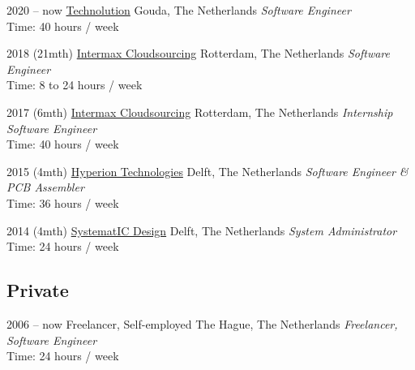\documentclass[]{friggeri-cv}
\begin{document}
\begin{entrylist}


\entry
{2020 -- now}
{\href{https://technolution.eu/}{Technolution}}
{Gouda, The Netherlands}
{\emph{Software Engineer} \\
Time: 40 hours / week}


\entry
{2018 (21mth)}
{\href{https://intermax.nl/}{Intermax Cloudsourcing}}
{Rotterdam, The Netherlands}
{\emph{Software Engineer} \\
Time: 8 to 24 hours / week}


\entry
{2017 (6mth)}
{\href{https://intermax.nl/}{Intermax Cloudsourcing}}
{Rotterdam, The Netherlands}
{\emph{Internship Software Engineer} \\
Time: 40 hours / week}


\entry
{2015 (4mth)}
{\href{https://hyperiontechnologies.nl/}{Hyperion Technologies}}
{Delft, The Netherlands}
{\emph{Software Engineer \& PCB Assembler} \\
Time: 36 hours / week}


\entry
{2014 (4mth)}
{\href{https://systemat-ic.com/}{SystematIC Design}}
{Delft, The Netherlands}
{\emph{System Administrator} \\
Time: 24 hours / week}


\end{entrylist}

\subsection{Private}

\begin{entrylist}


\entry
{2006 -- now}
{Freelancer, Self-employed}
{The Hague, The Netherlands}
{\emph{Freelancer, Software Engineer} \\
Time: 24 hours / week}


\end{entrylist}
\end{document}
